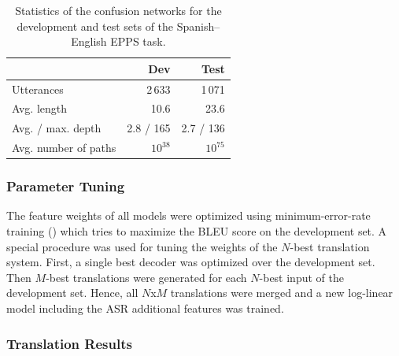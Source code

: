 \documentclass[11pt]{report}
\theoremstyle{plain}
\begin{document}
{\begin{table}[t]	
	\caption{Statistics of the confusion networks for the development and test sets of the Spanish--English EPPS task.}\label{tbl:epps-cn}
	\begin{center}
	\begin{tabular}{|l|r|r|}
	\hline
	& Dev & Test \\
	\hline
	Utterances & 2\,633  & 1\,071 \\
	Avg. length & 10.6 &  23.6 \\
	Avg. / max.  depth & 2.8  / 165 & 2.7 / 136  \\
	Avg. number of paths & $10^{38}$ & $10^{75}$ \\
	\hline
	\end{tabular}
	\end{center}
\end{table}


\subsubsection{Parameter Tuning}
The feature  weights of all models were optimized using minimum-error-rate training (\cite{och:03}) which tries to maximize the BLEU score on the development set.  
A special procedure was used for tuning the weights of the $N$-best translation system. 
First, a single best decoder was optimized over the development set. 
Then $M$-best translations were generated for each $N$-best input of the development set. 
Hence, all $N$x$M$ translations were merged and a new log-linear model  including the ASR additional features was trained. 


\subsubsection{Translation Results}

}
\end{document}
